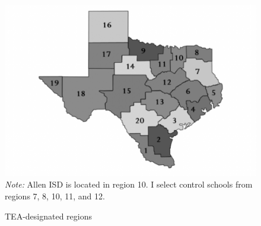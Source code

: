 \documentclass[hidelinks,twoside]{article}
\begin{document}
\begin{figure}[htbp]\caption[]{TEA-designated regions}
\centering
\begin{minipage}{0.5\linewidth}
\includegraphics[width=\linewidth]{TEA_regions.png}
\footnotesize
\emph{Note:} Allen ISD is located in region 10. I select control schools from regions 7, 8, 10, 11, and 12.
\end{minipage}
\label{fig:tearegion}
\end{figure}
\end{document}
